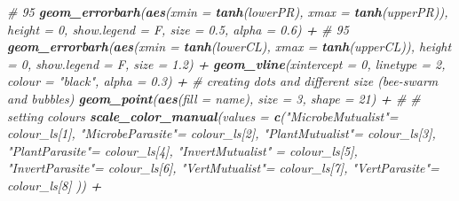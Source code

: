 \documentclass[
]{article}
\newenvironment{Shaded}{\begin{snugshade}}{\end{snugshade}}
\newcommand{\CommentTok}[1]{\textcolor[rgb]{0.56,0.35,0.01}{\textit{#1}}}
\newcommand{\DataTypeTok}[1]{\textcolor[rgb]{0.13,0.29,0.53}{#1}}
\newcommand{\DecValTok}[1]{\textcolor[rgb]{0.00,0.00,0.81}{#1}}
\newcommand{\FloatTok}[1]{\textcolor[rgb]{0.00,0.00,0.81}{#1}}
\newcommand{\KeywordTok}[1]{\textcolor[rgb]{0.13,0.29,0.53}{\textbf{#1}}}
\newcommand{\NormalTok}[1]{#1}
\newcommand{\OperatorTok}[1]{\textcolor[rgb]{0.81,0.36,0.00}{\textbf{#1}}}
\newcommand{\StringTok}[1]{\textcolor[rgb]{0.31,0.60,0.02}{#1}}
\begin{document}
\begin{Shaded}
\begin{Highlighting}[]
{{{\StringTok{  }\CommentTok{# 95 %
\StringTok{  }\KeywordTok{geom_errorbarh}\NormalTok{(}\KeywordTok{aes}\NormalTok{(}\DataTypeTok{xmin =} \KeywordTok{tanh}\NormalTok{(lowerPR), }\DataTypeTok{xmax =} \KeywordTok{tanh}\NormalTok{(upperPR)),  }\DataTypeTok{height =} \DecValTok{0}\NormalTok{, }\DataTypeTok{show.legend =}\NormalTok{ F, }\DataTypeTok{size =} \FloatTok{0.5}\NormalTok{, }\DataTypeTok{alpha =} \FloatTok{0.6}\NormalTok{) }\OperatorTok{+}
\StringTok{  }\CommentTok{# 95 %
\StringTok{  }\KeywordTok{geom_errorbarh}\NormalTok{(}\KeywordTok{aes}\NormalTok{(}\DataTypeTok{xmin =} \KeywordTok{tanh}\NormalTok{(lowerCL), }\DataTypeTok{xmax =} \KeywordTok{tanh}\NormalTok{(upperCL)),  }\DataTypeTok{height =} \DecValTok{0}\NormalTok{, }\DataTypeTok{show.legend =}\NormalTok{ F, }\DataTypeTok{size =} \FloatTok{1.2}\NormalTok{) }\OperatorTok{+}
\StringTok{  }\KeywordTok{geom_vline}\NormalTok{(}\DataTypeTok{xintercept =} \DecValTok{0}\NormalTok{, }\DataTypeTok{linetype =} \DecValTok{2}\NormalTok{, }\DataTypeTok{colour =} \StringTok{"black"}\NormalTok{, }\DataTypeTok{alpha =} \FloatTok{0.3}\NormalTok{) }\OperatorTok{+}
\StringTok{  }\CommentTok{# creating dots and different size (bee-swarm and bubbles)}
\StringTok{  }\KeywordTok{geom_point}\NormalTok{(}\KeywordTok{aes}\NormalTok{(}\DataTypeTok{fill =}\NormalTok{ name), }\DataTypeTok{size =} \DecValTok{3}\NormalTok{, }\DataTypeTok{shape =} \DecValTok{21}\NormalTok{) }\OperatorTok{+}\StringTok{ }\CommentTok{#}
\StringTok{  }\CommentTok{# setting colours}
\StringTok{  }\KeywordTok{scale_color_manual}\NormalTok{(}\DataTypeTok{values =}   \KeywordTok{c}\NormalTok{(}\StringTok{"MicrobeMutualist"}\NormalTok{=}\StringTok{ }\NormalTok{colour_ls[}\DecValTok{1}\NormalTok{], }\StringTok{"MicrobeParasite"}\NormalTok{=}\StringTok{ }\NormalTok{colour_ls[}\DecValTok{2}\NormalTok{],  }\StringTok{"PlantMutualist"}\NormalTok{=}\StringTok{ }\NormalTok{colour_ls[}\DecValTok{3}\NormalTok{], }\StringTok{"PlantParasite"}\NormalTok{=}\StringTok{ }\NormalTok{colour_ls[}\DecValTok{4}\NormalTok{], }\StringTok{"InvertMutualist"}\NormalTok{ =}\StringTok{ }\NormalTok{colour_ls[}\DecValTok{5}\NormalTok{],  }\StringTok{"InvertParasite"}\NormalTok{=}\StringTok{ }\NormalTok{colour_ls[}\DecValTok{6}\NormalTok{], }\StringTok{"VertMutualist"}\NormalTok{=}\StringTok{ }\NormalTok{colour_ls[}\DecValTok{7}\NormalTok{],     }\StringTok{"VertParasite"}\NormalTok{=}\StringTok{ }\NormalTok{colour_ls[}\DecValTok{8}\NormalTok{] )) }\OperatorTok{+}
}}}}}
\end{Highlighting}
\end{Shaded}
\end{document}
